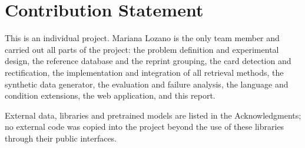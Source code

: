 \chapter{Contribution Statement}
\label{ch:contribution}


This is an individual project. Mariana Lozano is the only team member and carried out all parts of the project: the problem definition and experimental design, the reference database and the reprint grouping, the card detection and rectification, the implementation and integration of all retrieval methods, the synthetic data generator, the evaluation and failure analysis, the language and condition extensions, the web application, and this report.

External data, libraries and pretrained models are listed in the Acknowledgments; no external code was copied into the project beyond the use of these libraries through their public interfaces.

